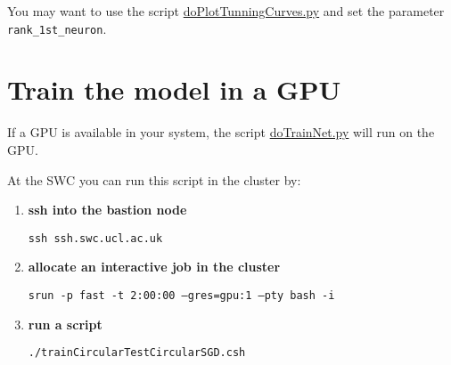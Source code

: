 \documentclass[12pt]{article}
\begin{document}
You may want to use the script
\href{https://github.com/joacorapela/statNeuro2025/blob/master/worksheets/08_artificialNeuralNetworks/code/scripts/doPlotTunningCurves.py}{doPlotTunningCurves.py}
and set the parameter \texttt{rank\_1st\_neuron}.

\section{Train the model in a GPU}

If a GPU is available in your system, the script
\href{https://github.com/joacorapela/statNeuro2025/blob/master/worksheets/08_artificialNeuralNetworks/code/scripts/doTrainNet.py}{doTrainNet.py}
will run on the GPU.

At the SWC you can run this script in the cluster by:

\begin{enumerate}

    \item \textbf{ssh into the bastion node}

        \texttt{ssh ssh.swc.ucl.ac.uk}

    \item \textbf{allocate an interactive job in the cluster}

        \texttt{srun -p fast -t 2:00:00 --gres=gpu:1 --pty bash -i}

    \item \textbf{run a script}

        \texttt{./trainCircularTestCircularSGD.csh}

\end{enumerate}
\end{document}
